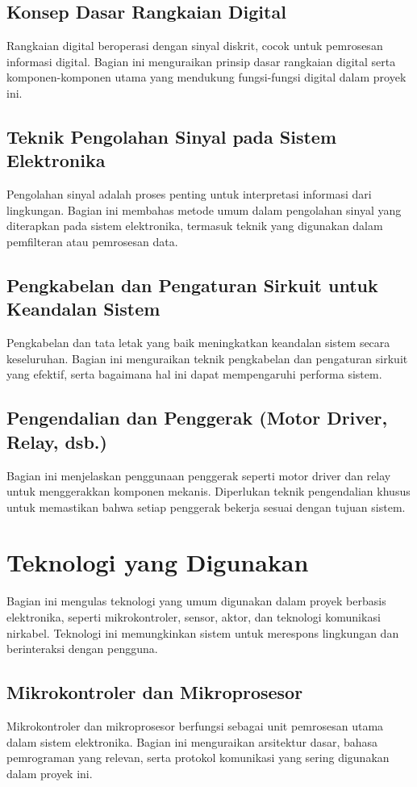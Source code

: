 \subsection{Konsep Dasar Rangkaian Digital}
Rangkaian digital beroperasi dengan sinyal diskrit, cocok untuk pemrosesan informasi digital. Bagian ini menguraikan prinsip dasar rangkaian digital serta komponen-komponen utama yang mendukung fungsi-fungsi digital dalam proyek ini.

\subsection{Teknik Pengolahan Sinyal pada Sistem Elektronika}
Pengolahan sinyal adalah proses penting untuk interpretasi informasi dari lingkungan. Bagian ini membahas metode umum dalam pengolahan sinyal yang diterapkan pada sistem elektronika, termasuk teknik yang digunakan dalam pemfilteran atau pemrosesan data.

\subsection{Pengkabelan dan Pengaturan Sirkuit untuk Keandalan Sistem}
Pengkabelan dan tata letak yang baik meningkatkan keandalan sistem secara keseluruhan. Bagian ini menguraikan teknik pengkabelan dan pengaturan sirkuit yang efektif, serta bagaimana hal ini dapat mempengaruhi performa sistem.

\subsection{Pengendalian dan Penggerak (Motor Driver, Relay, dsb.)}
Bagian ini menjelaskan penggunaan penggerak seperti motor driver dan relay untuk menggerakkan komponen mekanis. Diperlukan teknik pengendalian khusus untuk memastikan bahwa setiap penggerak bekerja sesuai dengan tujuan sistem.

\section{Teknologi yang Digunakan}
Bagian ini mengulas teknologi yang umum digunakan dalam proyek berbasis elektronika, seperti mikrokontroler, sensor, aktor, dan teknologi komunikasi nirkabel. Teknologi ini memungkinkan sistem untuk merespons lingkungan dan berinteraksi dengan pengguna.

\subsection{Mikrokontroler dan Mikroprosesor}
Mikrokontroler dan mikroprosesor berfungsi sebagai unit pemrosesan utama dalam sistem elektronika. Bagian ini menguraikan arsitektur dasar, bahasa pemrograman yang relevan, serta protokol komunikasi yang sering digunakan dalam proyek ini.

